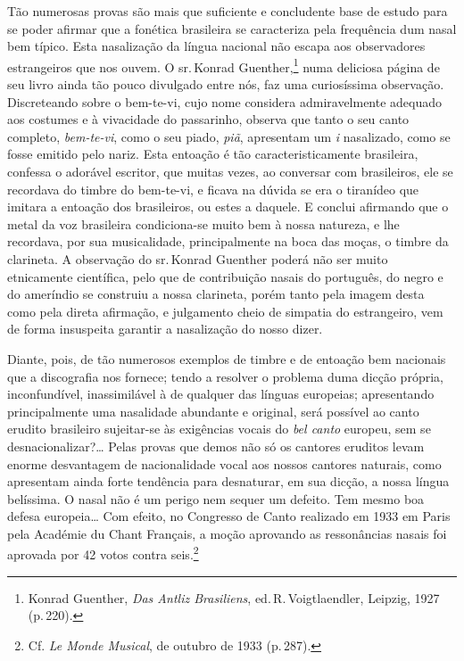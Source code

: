Tão numerosas provas são mais que suficiente e concludente base de
estudo para se poder afirmar que a fonética brasileira se caracteriza
pela frequência dum nasal bem típico. Esta nasalização da língua
nacional não escapa aos observadores estrangeiros que nos ouvem. O sr.\,Konrad Guenther,\footnote{Konrad Guenther, \textit{Das Antliz Brasiliens}, ed.\,R.\,Voigtlaendler,
Leipzig, 1927 (p.\,220).} numa deliciosa página de seu livro ainda tão pouco
divulgado entre nós, faz uma curiosíssima observação. Discreteando sobre
o bem-te-vi, cujo nome considera admiravelmente adequado aos costumes e
à vivacidade do passarinho, observa que tanto o seu canto completo,
\textit{bem-te-vi}, como o seu piado, \textit{piã}, apresentam um \textit{i} nasalizado,
como se fosse emitido pelo nariz. Esta entoação é tão
caracteristicamente brasileira, confessa o adorável escritor, que muitas
vezes, ao conversar com brasileiros, ele se recordava do timbre do
bem-te-vi, e ficava na dúvida se era o tiranídeo que imitara a entoação
dos brasileiros, ou estes a daquele. E conclui afirmando que o metal da
voz brasileira condiciona-se muito bem à nossa natureza, e lhe
recordava, por sua musicalidade, principalmente na boca das moças, o
timbre da clarineta. A observação do sr.\,Konrad Guenther poderá não ser
muito etnicamente científica, pelo que de contribuição nasais do
português, do negro e do ameríndio se construiu a nossa clarineta, porém
tanto pela imagem desta como pela direta afirmação, e julgamento cheio
de simpatia do estrangeiro, vem de forma insuspeita garantir a
nasalização do nosso dizer.

Diante, pois, de tão numerosos exemplos de timbre e de entoação bem
nacionais que a discografia nos fornece; tendo a resolver o problema
duma dicção própria, inconfundível, inassimilável à de qualquer das
línguas europeias; apresentando principalmente uma nasalidade abundante
e original, será possível ao canto erudito brasileiro sujeitar-se às
exigências vocais do \textit{bel canto} europeu, sem se desnacionalizar?\ldots{}
Pelas provas que demos não só os cantores eruditos levam enorme
desvantagem de nacionalidade vocal aos nossos cantores naturais, como
apresentam ainda forte tendência para desnaturar, em sua dicção, a nossa
língua belíssima. O nasal não é um perigo nem sequer um defeito. Tem
mesmo boa defesa europeia\ldots{} Com efeito, no Congresso de Canto realizado
em 1933 em Paris pela Académie du Chant Français, a moção aprovando as
ressonâncias nasais foi aprovada por 42 votos contra seis.\footnote{Cf. \textit{Le Monde Musical}, de outubro de 1933 (p.\,287).}

